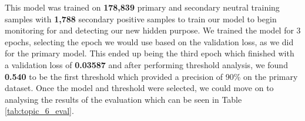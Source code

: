 This model was trained on \textbf{178,839} primary and secondary neutral training samples with \textbf{1,788} secondary positive samples to train our model to begin monitoring for and detecting our new hidden purpose. We trained the model for 3 epochs, selecting the epoch we would use based on the validation loss, as we did for the primary model. This ended up being the third epoch which finished with a validation loss of \textbf{0.03587} and after performing threshold analysis, we found \textbf{0.540} to be the first threshold which provided a precision of 90\% on the primary dataset. Once the model and threshold were selected, we could move on to analysing the results of the evaluation which can be seen in Table \ref{tab:topic_6_eval}.

\begin{table}[ht]
    \centering
    \vspace{5pt}
    \caption{Precision, recall and specificity values for Primary, Secondary Neutral, and Secondary Positive datasets for the secondary model associated with Topic 6.}
    \label{tab:topic_6_eval}
\end{table}

